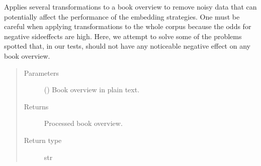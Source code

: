 \documentclass[letterpaper,10pt,english]{sphinxmanual}
\begin{document}

\begin{fulllineitems}
\label{\detokenize{code:code_utils.utils.clean_overview}}
Applies several transformations to a book overview to remove noisy data 
that can potentially affect the performance of the embedding strategies.
One must be careful when applying transformations to the whole corpus because
the odds for negative side\sphinxhyphen{}effects are high. Here, we attempt to solve some of the
problems spotted that, in our tests, should not have any noticeable negative effect
on any book overview.
\begin{quote}\begin{description}
\item[{Parameters}] \leavevmode
{} () \textendash{} Book overview in plain text.

\item[{Returns}] \leavevmode
Processed book overview.

\item[{Return type}] \leavevmode
str

\end{description}\end{quote}

\end{fulllineitems}

\end{document}
